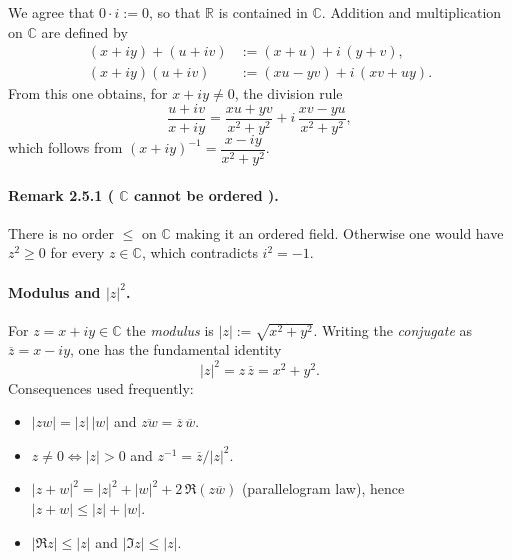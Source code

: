\documentclass[12pt,a4paper]{article}
\newcommand{\R}{\mathbb{R}}
\newcommand{\C}{\mathbb{C}}
\newcommand{\NumberedRemark}[3]{%
  \paragraph{Remark #1 ( #2 ).} #3\par
}
\theoremstyle{plain}
\theoremstyle{definition}
\theoremstyle{remark}
\begin{document}
We agree that $0\cdot i:=0$, so that $\R$ is contained in $\C$. Addition and multiplication on $\C$ are defined by
\begin{align*}
	(x+iy)+(u+iv) &:= (x+u) + i\,(y+v),\\
	(x+iy)(u+iv) &:= (xu - yv) + i\,(xv + uy).
\end{align*}
From this one obtains, for $x+iy\ne 0$, the division rule
\[
	\frac{u+iv}{x+iy}
	 = \frac{xu+yv}{x^2+y^2} 
		 + i\,\frac{xv-yu}{x^2+y^2},
\]
which follows from $(x+iy)^{-1}=\dfrac{x-iy}{x^2+y^2}$.

\NumberedRemark{2.5.1}{\(\C\) cannot be ordered}{There is no order $\le$ on $\C$ making it an ordered field. Otherwise one would have $z^2\ge 0$ for every $z\in\C$, which contradicts $i^2=-1$.}

\paragraph{Modulus and $|z|^2$.}
For $z=x+iy\in\C$ the \emph{modulus} is $|z|:=\sqrt{x^2+y^2}$. Writing the \emph{conjugate} as $\overline{z}=x-iy$, one has the fundamental identity
\[
  |z|^2 = z\,\overline{z} = x^2+y^2. 
\]
Consequences used frequently:
\begin{itemize}[leftmargin=*]
  \item $|zw|=|z|\,|w|$ and $\overline{zw}=\overline{z}\,\overline{w}$.
  \item $z\neq0 \iff |z|>0$ and $z^{-1}=\overline{z}/|z|^2$.
  \item $|z+w|^2 = |z|^2 + |w|^2 + 2\,\Re( z\overline{w} )$ (parallelogram law), hence $|z+w|\le |z|+|w|$.
  \item $|\Re z|\le |z|$ and $|\Im z|\le |z|$.
\end{itemize}
\end{document}
